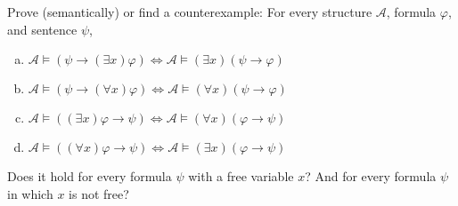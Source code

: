 \begin{problem}
\begin{solution}
    \end{solution}

\end{problem}


\begin{problem}

    Prove (semantically) or find a counterexample: For every structure $\mathcal{A}$, formula $\varphi$, and sentence $\psi$,
    \begin{enumerate}[(a)]
    \item $\mathcal{A}\models (\psi \to (\exists x)\varphi) \Leftrightarrow \mathcal{A}\models (\exists x)(\psi \to \varphi)$
    \item $\mathcal{A}\models (\psi \to (\forall x)\varphi) \Leftrightarrow \mathcal{A}\models (\forall x)(\psi \to \varphi)$
    \item $\mathcal{A}\models ((\exists x)\varphi \to \psi) \Leftrightarrow \mathcal{A}\models (\forall x)(\varphi \to \psi)$
    \item $\mathcal{A}\models ((\forall x)\varphi \to \psi ) \Leftrightarrow \mathcal{A}\models (\exists x)(\varphi \to \psi)$
    \end{enumerate}
    Does it hold for every formula $\psi$ with a free variable $x$? And for every formula $\psi$ in which $x$ is not free?

    \begin{solution}


\end{solution}
\end{problem}

